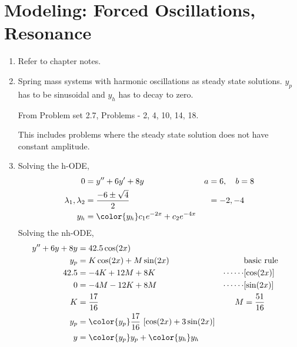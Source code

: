 \section{Modeling: Forced Oscillations, Resonance}

\begin{enumerate}
    \item Refer to chapter notes.

    \item Spring mass systems with harmonic oscillations as steady state solutions.
          $ y_{p} $ has to be sinusoidal and $ y_{h} $ has to decay to zero. \par
          From Problem set 2.7, Problems - 2, 4, 10, 14, 18. \par
          This includes problems where the steady state solution does not have constant
          amplitude.

    \item Solving the h-ODE,
          \begin{align}
              0                        & = y'' + 6y' + 8y                          &
              a                        & = 6, \quad b = 8                            \\
              \lambda_{1}, \lambda_{2} & = \frac{-6 \pm \sqrt{4}}{2}               &
                                       & = -2, -4                                    \\
              y_{h}                    & = \color{y_h} c_{1}e^{-2x} + c_{2}e^{-4x}
          \end{align}
          Solving the nh-ODE,
          \begin{align}
              y'' + 6y + 8y & = 42.5\cos(2x)                                        \\
              y_{p}         & = K \cos(2x) + M \sin(2x)                           &
                            & \text{basic rule}                                     \\
              42.5          & = -4K + 12M + 8K                                    &
              \cdots\cdots  & [\cos(2x)]                                            \\
              0             & = -4M - 12K + 8M                                    &
              \cdots\cdots  & [\sin(2x)]                                            \\
              K             & = \frac{17}{16}                                     &
              M             & = \frac{51}{16}                                       \\
              y_{p}         & = \color{y_p} \frac{17}{16}\ [\cos(2x) + 3\sin(2x)]   \\
              y             & = {\color{y_p} y_{p}} + {\color{y_h} y_{h}}
          \end{align}


\end{enumerate}
